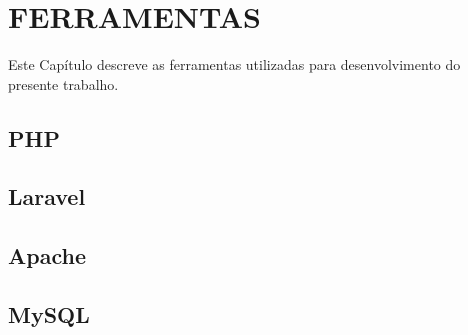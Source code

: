 
\chapter{FERRAMENTAS}
Este Capítulo descreve as ferramentas utilizadas para desenvolvimento do presente trabalho.


\section{PHP}


\section{Laravel}


\section{Apache}
%

\section{MySQL}
%
